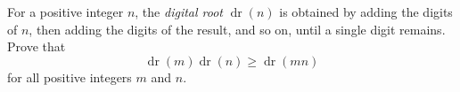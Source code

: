 For a positive integer $n$, the \emph{digital root} $\operatorname{dr}(n)$ is obtained by adding the digits of $n$, then adding the digits of the result, and so on, until a single digit remains. Prove that
\[
\operatorname{dr}(m)\operatorname{dr}(n)\ge\operatorname{dr}(mn)
\]
for all positive integers $m$ and $n$.
